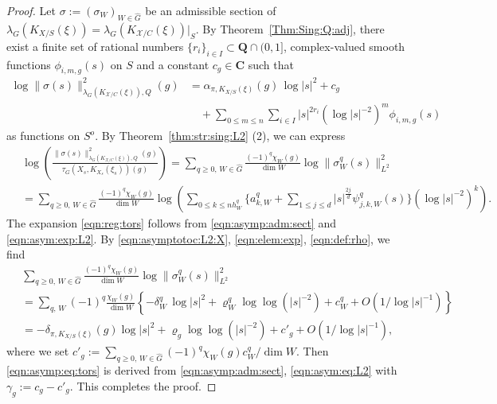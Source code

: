 \documentclass[amscd, leqno]{amsart}
\theoremstyle{plain}
\theoremstyle{definition}
\theoremstyle{remark}
\newenvironment{pf}{\begin{proof}}{\end{proof}}
\begin{document}
\begin{pf}
Let $\sigma:=(\sigma_{W})_{W\in\widehat{G}}$ be an admissible section of 
$\lambda_{G}(K_{X/S}(\xi)) = \lambda_{G}(K_{{\mathcal X}/C}(\xi))|_{S}$. 
By Theorem~\ref{Thm:Sing:Q:adj}, there exist a finite set of rational numbers $\{ r_{i} \}_{i \in I} \subset {\mathbf Q}\cap (0,1]$,
complex-valued smooth functions $\phi_{i,m,g}(s)$ on $S$ and a constant $c_{g} \in {\mathbf C}$ such that
\begin{equation}
\label{eqn:asymp:adm:sect}
\begin{aligned}
\log\| \sigma(s) \|_{\lambda_{G}(K_{{\mathcal X}/C}(\xi)),Q}^{2}(g) 
&= 
\alpha_{\pi, K_{X/S}(\xi)}(g)\,\log | s |^{2} + c_{g} 
\\
&\quad + \sum_{0\leq m \leq n}\sum_{i\in I} |s|^{2r_{i}} (\log |s|^{-2})^{m} \phi_{i,m,g}(s)
\end{aligned}
\end{equation}
as functions on $S^{o}$. By Theorem~\ref{thm:str:sing:L2} (2), we can express
\begin{equation}
\label{eqn:asym:exp:L2}
\begin{aligned}
\,&
\log \left( \frac{\|\sigma(s)\|_{\lambda_{G}(K_{{\mathcal X}/C}(\xi)),Q}^{2}(g)}{\tau_{G}(X_{s},K_{X_{s}}(\xi_{s}))(g)} \right)
=
\sum_{q\geq0,\,W\in\widehat{G}} \frac{(-1)^{q}\chi_{W}(g)}{\dim W} \log \|\sigma^{q}_{W}(s)\|_{L^{2}}^{2}
\\
&=
\sum_{q\geq0,\,W\in\widehat{G}} \frac{(-1)^{q}\chi_{W}(g)}{\dim W} 
\log \left( \sum_{0\leq k \leq n h_{W}^{q}} \{ a_{k,W}^{q} + \sum_{1\leq j \leq d} |s|^{\frac{2j}{d}} \psi_{j,k,W}^{q}(s) \} (\log |s|^{-2})^{k} \right).
\end{aligned}
\end{equation}
The expansion \eqref{eqn:reg:tors} follows from \eqref{eqn:asymp:adm:sect} and \eqref{eqn:asym:exp:L2}.
By \eqref{eqn:asymptotoc:L2:X}, \eqref{eqn:elem:exp}, \eqref{eqn:def:rho}, we find
\begin{equation}
\label{eqn:asym:eq:L2}
\begin{aligned}
\,&
\sum_{q\geq0,\,W\in\widehat{G}} \frac{(-1)^{q}\chi_{W}(g)}{\dim W} \log \|\sigma^{q}_{W}(s)\|_{L^{2}}^{2}
\\
&=
\sum_{q,\,W}(-1)^{q}\frac{\chi_{W}(g)}{\dim W} \left\{ -\delta_{W}^{q}\,\log |s|^{2} 
+ \varrho_{W}^{q} \log\log (|s|^{-2}) + c_{W}^{q} + O\left(1/\log |s|^{-1}\right)
\right\}
\\
&=
-\delta_{\pi, K_{X/S}(\xi)}(g) \log |s|^{2} + \varrho_{g} \log\log (|s|^{-2}) + c'_{g} + O\left( 1/\log |s|^{-1} \right),
\end{aligned}
\end{equation}
where we set $c'_{g} := \sum_{q\geq0,\,W\in\widehat{G}} (-1)^{q} \chi_{W}(g) c_{W}^{q}/\dim W$. 
Then \eqref{eqn:asymp:eq:tors} is derived from \eqref{eqn:asymp:adm:sect}, \eqref{eqn:asym:eq:L2} with $\gamma_{g} := c_{g} - c'_{g}$.
This completes the proof.
\end{pf}
\end{document}
